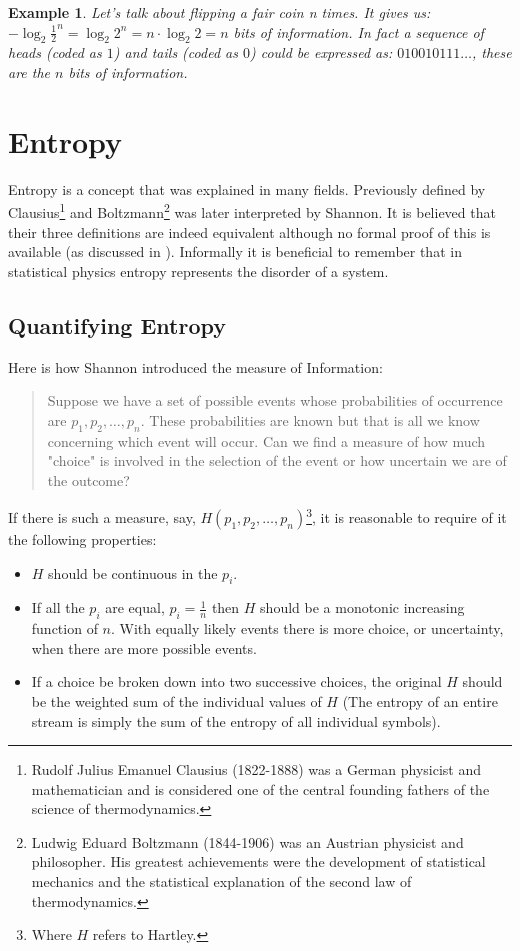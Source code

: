 \documentclass[12pt, a4paper]{report}
\newtheorem{example}{Example} %
\begin{document}
\begin{example}
Let's talk about flipping a fair coin n times. It gives us: \(- \log_2 \frac{1}{2}^n = \log_2 2^n = n \cdot \log_2 2 = n\) bits of
information. In fact a sequence of heads (coded as \(1\)) and tails (coded as \(0\)) could be expressed as: \(010010111\dots\),
these are the \(n\) bits of information.
\end{example}

\chapter{Entropy}

Entropy is a concept that was explained in many fields.
Previously defined by Clausius\footnote{Rudolf Julius Emanuel Clausius (1822-1888) was a German physicist and mathematician and is
considered one of the central founding fathers of the science of thermodynamics.} and Boltzmann\footnote{Ludwig Eduard Boltzmann
(1844-1906) was an Austrian physicist and philosopher. His greatest achievements were the development of statistical mechanics and
the statistical explanation of the second law of thermodynamics.} was later interpreted by Shannon.
It is believed that their three definitions are indeed equivalent although no formal proof of this is available (as discussed in
\cite{EntropyAndInformationTheoryUsesAndMisuses}).
Informally it is beneficial to remember that in statistical physics entropy represents the disorder of a system.

\section{Quantifying Entropy}

Here is how Shannon introduced the measure of Information:
\begin{quote}
Suppose we have a set of possible events whose probabilities of occurrence are \(p_1, p_2, \dots, p_n\).
These probabilities are known but that is all we know concerning which event will occur.
Can we find a measure of how much "choice" is involved in the selection of the event or how uncertain we are of the outcome?
\end{quote}
If there is such a measure, say, \(H(p_1, p_2, \dots, p_n)\)\footnote{Where \(H\) refers to Hartley.}, it is reasonable to require
of it the following properties:
\begin{itemize}
  \item \(H\) should be continuous in the \(p_i\).
  \item If all the \(p_i\) are equal, \(p_i = \frac{1}{n}\) then \(H\) should be a monotonic increasing function of \(n\). With
        equally likely events there is more choice, or uncertainty, when there are more possible events.
  \item If a choice be broken down into two successive choices, the original \(H\) should be the weighted sum of the individual
        values of \(H\) (The entropy of an entire stream is simply the sum of the entropy of all individual symbols).
\end{itemize}
\end{document}
